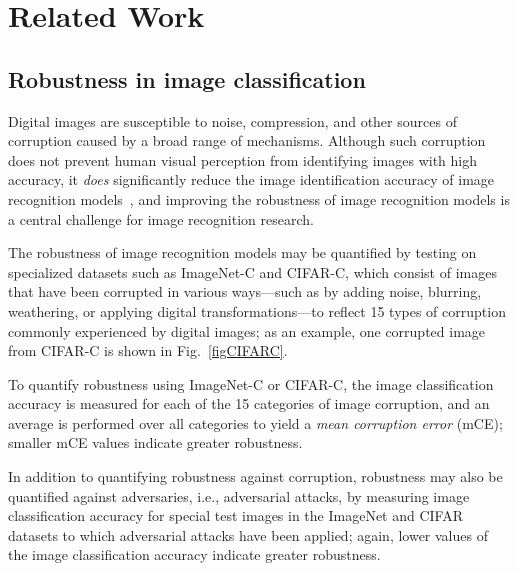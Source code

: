 \section{Related Work}
\label{sec:related}

\subsection{Robustness in image classification}
\label{sec:Robustness}

Digital images are susceptible to noise,
compression, and other sources of corruption
caused by a broad range of mechanisms.
Although such corruption does not prevent
human visual perception from identifying
images with high accuracy, it \textit{does}
significantly reduce the image identification accuracy
of image recognition models~\cite{ImageNet-C},
and improving the robustness of image recognition models
is a central challenge for image recognition research.

The robustness of image recognition models
may be quantified by testing on specialized
datasets such as ImageNet-C and CIFAR-C, which
consist of images that have been corrupted in various
ways---such as by adding noise, blurring, weathering,
or applying digital transformations---to reflect 15
types of corruption commonly experienced by
digital images; as an example, one corrupted image 
from CIFAR-C is shown in Fig.~\ref{figCIFARC}.

To quantify robustness using ImageNet-C or CIFAR-C,
the image classification accuracy is measured for each of the
15 categories of image corruption, and an average is performed over all
categories to yield a \textit{mean corruption error} (mCE);
smaller mCE values indicate greater robustness.

In addition to quantifying robustness against corruption,
robustness may also be quantified against adversaries, 
i.e., adversarial attacks, by measuring
image classification accuracy for special test images
in the ImageNet and CIFAR datasets to which adversarial
attacks have been applied; again, lower values of the 
image classification accuracy indicate greater robustness.


